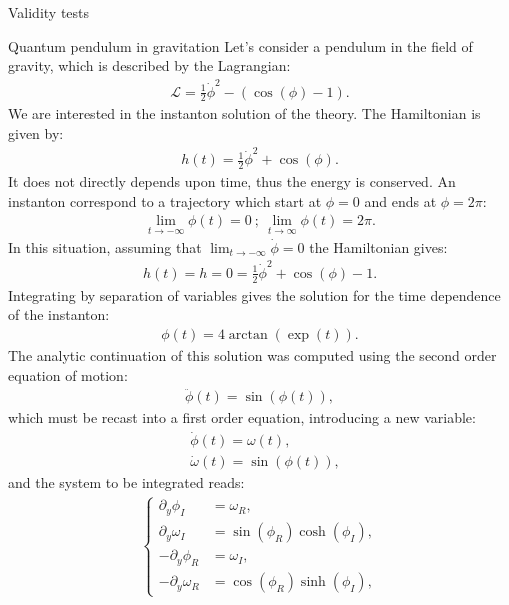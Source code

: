 \begin{section}{Validity tests}
\begin{subsection}{Quantum pendulum in gravitation}
    Let's consider a pendulum in the field of gravity, which is
    described by the Lagrangian:
    \begin{align}
      \mathcal L = \frac{1}{2}\dot{\phi}^2-(\cos(\phi)-1).
    \end{align}
    We are interested in the instanton solution of the theory. The
    Hamiltonian is given by:
    \begin{align}
      h(t) = \frac{1}{2}\dot{\phi}^2+\cos(\phi).
    \end{align}
    It does not directly depends upon time, thus the energy is conserved. An
    instanton correspond to a trajectory which start at $\phi = 0$ and
    ends at $\phi = 2\pi$:
    \begin{align}
      \lim_{t\to-\infty} \phi(t) = 0\ ;\ \lim_{t\to \infty} \phi(t) = 2\pi.
    \end{align}
    In this situation, assuming that $\lim_{t\to-\infty}\dot{\phi} =
    0$ the Hamiltonian gives:
    \begin{align}
      h(t) = h = 0 = \frac{1}{2}\dot{\phi}^2+\cos(\phi)-1.
    \end{align}
    Integrating by separation of variables gives the solution for the
    time dependence of the instanton:
    \begin{align}
      \phi(t) = 4\arctan(\exp(t)).
    \end{align}
    The analytic continuation of this solution was computed using
    the second order equation of motion:
    \begin{align}
      \ddot\phi(t) = \sin(\phi(t)),
    \end{align}
    which must be recast into a first order equation, introducing a
    new variable:
    \begin{align}
      &\dot\phi(t) = \omega(t),\\
      &\dot\omega(t) = \sin(\phi(t)),
    \end{align}
    and the system to be integrated reads:
    \begin{align}
      \left\{
      \begin{aligned}
        \partial_y \phi_I &= \omega_R,\\
        \partial_y \omega_I &= \sin(\phi_R)\cosh(\phi_I),\\
        -\partial_y \phi_R &= \omega_I,\\
        -\partial_y \omega_R &= \cos(\phi_R)\sinh(\phi_I),
      \end{aligned}
      \right.
    \end{align}

\end{subsection}
\end{section}
